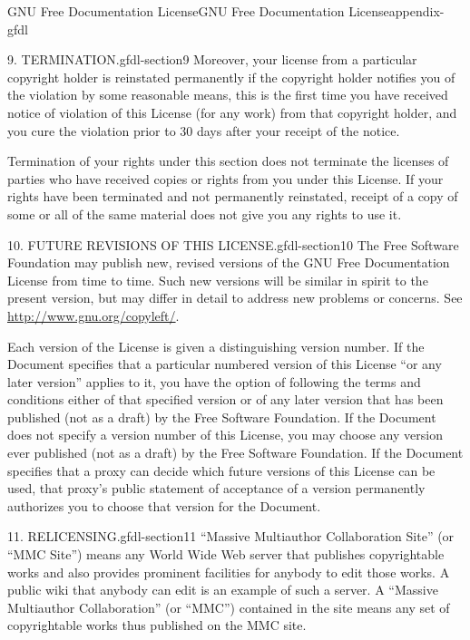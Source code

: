 \documentclass[oneside,10pt,]{book}
\numberwithin{equation}{section}
\begin{document}
\begin{appendixptx}{GNU Free Documentation License}{}{GNU Free Documentation License}{}{}{appendix-gfdl}
\begin{paragraphs}{9. TERMINATION.}{gfdl-section9}
\hypertarget{p-1609}{}%
Moreover, your license from a particular copyright holder is reinstated permanently if the copyright holder notifies you of the violation by some reasonable means, this is the first time you have received notice of violation of this License (for any work) from that copyright holder, and you cure the violation prior to 30 days after your receipt of the notice.%
\par
\hypertarget{p-1610}{}%
Termination of your rights under this section does not terminate the licenses of parties who have received copies or rights from you under this License. If your rights have been terminated and not permanently reinstated, receipt of a copy of some or all of the same material does not give you any rights to use it.%
\end{paragraphs}%
\begin{paragraphs}{10. FUTURE REVISIONS OF THIS LICENSE.}{gfdl-section10}%
\hypertarget{p-1611}{}%
The Free Software Foundation may publish new, revised versions of the GNU Free Documentation License from time to time. Such new versions will be similar in spirit to the present version, but may differ in detail to address new problems or concerns. See \url{http://www.gnu.org/copyleft/}.%
\par
\hypertarget{p-1612}{}%
Each version of the License is given a distinguishing version number. If the Document specifies that a particular numbered version of this License ``or any later version'' applies to it, you have the option of following the terms and conditions either of that specified version or of any later version that has been published (not as a draft) by the Free Software Foundation. If the Document does not specify a version number of this License, you may choose any version ever published (not as a draft) by the Free Software Foundation. If the Document specifies that a proxy can decide which future versions of this License can be used, that proxy's public statement of acceptance of a version permanently authorizes you to choose that version for the Document.%
\end{paragraphs}%
\begin{paragraphs}{11. RELICENSING.}{gfdl-section11}%
\hypertarget{p-1613}{}%
``Massive Multiauthor Collaboration Site'' (or ``MMC Site'') means any World Wide Web server that publishes copyrightable works and also provides prominent facilities for anybody to edit those works. A public wiki that anybody can edit is an example of such a server. A ``Massive Multiauthor Collaboration'' (or ``MMC'') contained in the site means any set of copyrightable works thus published on the MMC site.%

\end{paragraphs}
\end{appendixptx}
\end{document}
